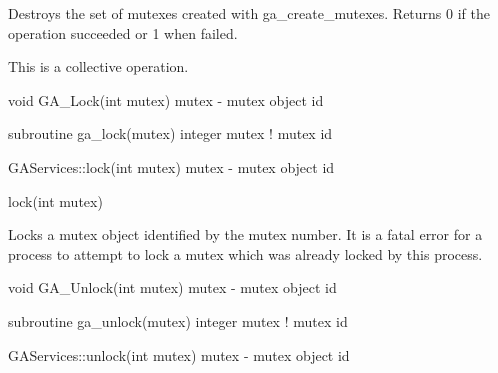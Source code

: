 \documentclass[12pt]{article}
\begin{document}
\begin{desc}

Destroys the set of mutexes created with ga_create_mutexes. Returns 0 if 
the operation succeeded or 1 when failed.

This is a collective operation.
\end{desc}


\begin{capi}
void GA_Lock(int mutex)
   mutex - mutex object id                                                \access{[input]} 
\end{capi}

\begin{fapi}
subroutine ga_lock(mutex)
   integer mutex                                                          \access{[input]}   
   ! mutex id
\end{fapi}

\begin{cxxapi}
GAServices::lock(int mutex)
   mutex - mutex object id                                                \access{[input]}
\end{cxxapi}

\begin{pyapi}
lock(int mutex)  
\end{pyapi}


\begin{desc}

Locks a mutex object identified by the mutex number. It is a fatal 
error for a process to attempt to lock a mutex which was already 
locked by this process.
\end{desc}


\begin{capi}
void GA_Unlock(int mutex)
   mutex  - mutex object id                                               \access{[input]} 
\end{capi}

\begin{fapi}
subroutine ga_unlock(mutex)
   integer mutex                                                          \access{[input]}  
   ! mutex id
\end{fapi}

\begin{cxxapi}
GAServices::unlock(int mutex)
mutex - mutex object id                                                   \access{[input]}
\end{cxxapi}
\end{document}
